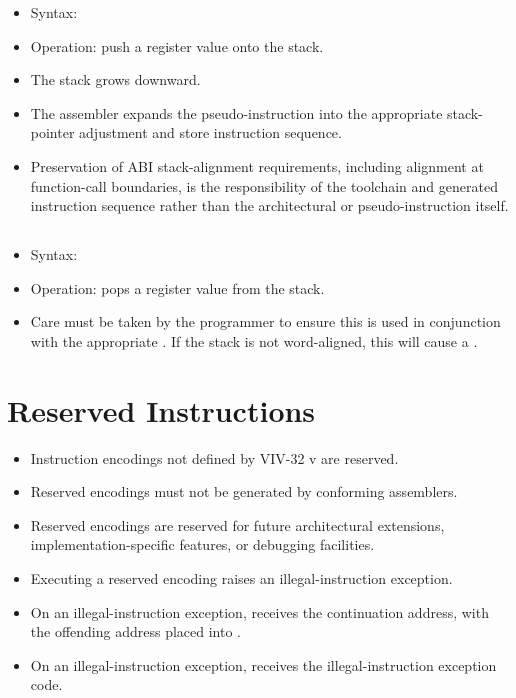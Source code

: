\begin{itemize}
\item Syntax: 
\item Operation: push a register value onto the stack.
\item The stack grows downward.
\item The assembler expands the pseudo-instruction into the appropriate
      stack-pointer adjustment and store instruction sequence.
\item Preservation of ABI stack-alignment requirements, including alignment
      at function-call boundaries, is the responsibility of the toolchain
      and generated instruction sequence rather than the architectural
       or  pseudo-instruction itself.
\end{itemize}

\subsection{}

\begin{itemize}
  \item Syntax: 
  \item Operation: pops a register value from the stack.
  \item Care must be taken by the programmer to ensure this is used in
        conjunction with the appropriate . If the stack is
        not word-aligned, this will cause a .
\end{itemize}

\section{Reserved Instructions}

\begin{itemize}
  \item Instruction encodings not defined by VIV-32 v\version{} are reserved.
  \item Reserved encodings must not be generated by conforming assemblers.
  \item Reserved encodings are reserved for future architectural extensions, implementation-specific features, or debugging facilities.
  \item Executing a reserved encoding raises an illegal-instruction exception.
  \item On an illegal-instruction exception,  receives the continuation address, with
        the offending address placed into .
  \item On an illegal-instruction exception,  receives the illegal-instruction exception code.
\end{itemize}

